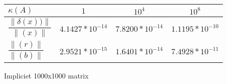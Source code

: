 \begin{tabular}{|l|c|c|c|}
\hline
$\kappa(A)$ & $1$ & $10^4$ & $10^8$ \\ \hline
$\dfrac{\|\delta(x))\|}{\|(x)\|}  $ & $4.1427*10^{-14}$ & $7.8200*10^{-14}$ & $1.1195*10^{-10}$ \\ \hline
$\dfrac{\|(r)\|}{\|(b)\|}$ & $ 2.9521*10^{-15}$ & $1.6401*10^{-14}$ & $7.4928*10^{-11}$ \\ \hline
\end{tabular}
\caption{Impliciet 1000x1000 matrix}